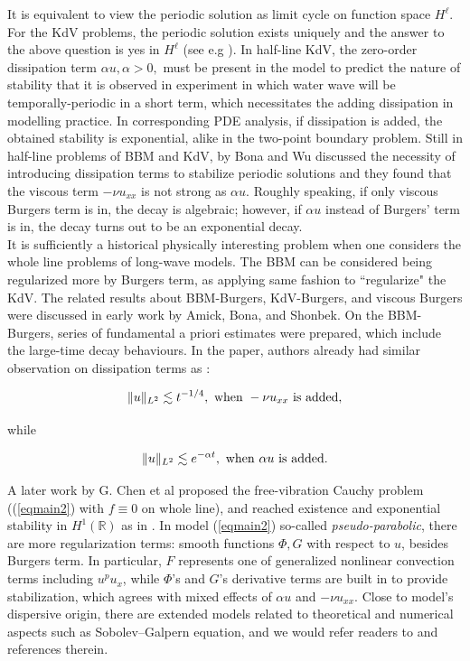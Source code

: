 \documentclass[10pt,a4paper,final]{article}
\numberwithin{equation}{section}
\begin{document}
It is equivalent to view the periodic solution as limit cycle on function space $H^\ell$. For the KdV problems, the periodic solution exists uniquely and the answer to the above question is yes in $H^\ell$ (see e.g \cite{BSZ2, UsmanZ2}). In half-line KdV, the zero-order dissipation term $\alpha u, \alpha > 0,$ must be present in the model to predict the nature of stability that it is observed in experiment in which water wave will be temporally-periodic in a short term, which necessitates the adding dissipation in modelling practice. In corresponding PDE analysis, if dissipation is added, the obtained stability is exponential, alike in the two-point boundary problem. Still in half-line problems of BBM and KdV, \cite{BW} by Bona and Wu discussed the necessity of introducing dissipation terms to stabilize periodic solutions and they found that the viscous term $-\nu u_{xx}$ is not strong as $\alpha u$. Roughly speaking, if only viscous Burgers term is in, the decay is algebraic; however, if $\alpha u$ instead of Burgers' term is in, the decay turns out to be an exponential decay.\\ 

It is sufficiently a historical physically interesting problem when one considers the whole line problems of long-wave models. The BBM can be considered being regularized more by Burgers term, as applying same fashion to ``regularize" the KdV. The related results about BBM-Burgers, KdV-Burgers, and viscous Burgers were discussed in early work \cite{Amick} by Amick, Bona, and Shonbek. On the BBM-Burgers, series of fundamental a priori estimates were prepared, which include the large-time decay behaviours. In the paper, authors already had similar observation on dissipation terms as \cite{BW}: 

$$\|u\|_{L^2}\lesssim t^{-1/4}, \,\,{\rm when}\,\, -\nu u_{xx}\,\,{\rm is\,\, added,}$$ 

while  

$$\|u\|_{L^2}\lesssim e^{-\alpha t},\,\,{\rm when}\,\, \alpha u\,\,{\rm is\,\,added.}$$ 

A later work \cite{GChen} by G. Chen et al proposed the free-vibration Cauchy problem ((\ref{eqmain2}) with $f\equiv 0$ on whole line), and reached existence and exponential stability in $H^1(\mathbb{R})$ as in \cite{Amick}. In model (\ref{eqmain2}) so-called {\it pseudo-parabolic}, there are more regularization terms: smooth functions $\Phi, G$ with respect to $u$, besides Burgers term. In particular, $F$ represents one of generalized nonlinear convection terms including $u^pu_x$, while $\Phi$'s and $G$'s derivative terms are built in to provide stabilization, which agrees with mixed effects of $\alpha u$ and $-\nu u_{xx}$. Close to model's dispersive origin, there are extended models related to theoretical and numerical aspects such as Sobolev–Galpern equation, and we would refer readers to  \cite{GChen} and references therein. \\
\end{document}
